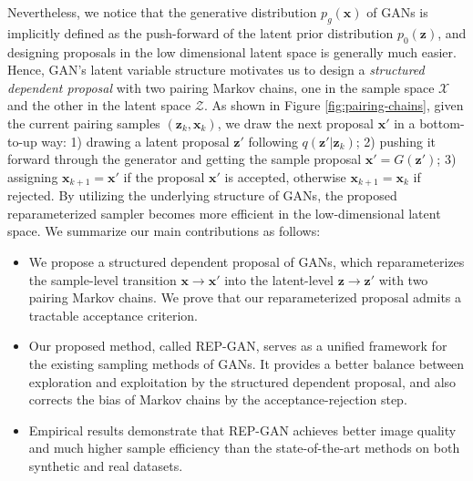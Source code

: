\documentclass[runningheads]{llncs}
\newcommand{\bx}{\mathbf{x}}
\newcommand{\bz}{\mathbf{z}}
\newcommand{\cX}{\mathcal{X}}
\newcommand{\cZ}{\mathcal{Z}}
\newcommand{\<}{\left\langle}
\renewcommand{\>}{\right\rangle}
\begin{document}
Nevertheless, we notice that the generative distribution $p_g(\bx)$ of GANs is implicitly defined as the push-forward of the latent prior distribution $p_0(\bz)$, and designing proposals in the low dimensional latent space is generally much easier. Hence, GAN's latent variable structure motivates us to design a \emph{structured dependent proposal} with two pairing Markov chains, one in the sample space $\cX$ and the other in the latent space $\cZ$. As shown in Figure \ref{fig:pairing-chains}, given the current pairing samples $(\bz_k,\bx_k)$, we draw the next proposal $\bx'$ in a bottom-to-up way: 1) drawing a latent proposal $\bz'$ following $q(\bz'|\bz_k)$; 2) pushing it forward through the generator and getting the sample proposal $\bx'=G(\bz')$; 3) assigning $\bx_{k+1}=\bx'$ if the proposal $\bx'$ is accepted, otherwise $\bx_{k+1}=\bx_k$ if rejected. By utilizing the underlying structure of GANs, the proposed reparameterized sampler becomes more efficient in the low-dimensional latent space. 
We summarize our main contributions as follows:
\begin{itemize}
    \item We propose a structured dependent proposal of GANs, which reparameterizes the sample-level transition $\bx\to\bx'$ into the latent-level  $\bz\to\bz'$ with two pairing Markov chains. We prove that our reparameterized proposal admits
    a tractable acceptance criterion.
    \item Our proposed method, called REP-GAN, serves as a unified framework for the existing sampling methods of GANs. It provides a better balance between exploration and exploitation by the structured dependent proposal, and also corrects the bias of Markov chains by the acceptance-rejection step. 
    \item Empirical results demonstrate that REP-GAN achieves better image quality and much higher sample efficiency than the state-of-the-art methods on both synthetic and real datasets. 
\end{itemize}
\end{document}
